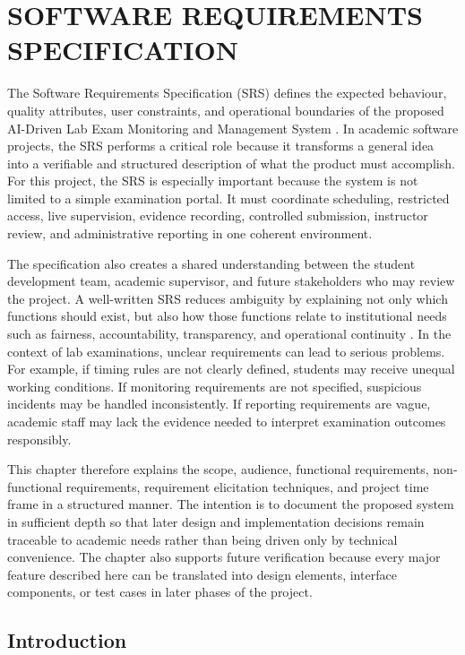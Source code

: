 \chapter{SOFTWARE REQUIREMENTS SPECIFICATION}
\label{chap:srs}

The Software Requirements Specification (SRS) defines the expected behaviour, quality attributes, user constraints, and operational boundaries of the proposed AI-Driven Lab Exam Monitoring and Management System \cite{srs1}. In academic software projects, the SRS performs a critical role because it transforms a general idea into a verifiable and structured description of what the product must accomplish. For this project, the SRS is especially important because the system is not limited to a simple examination portal. It must coordinate scheduling, restricted access, live supervision, evidence recording, controlled submission, instructor review, and administrative reporting in one coherent environment.

The specification also creates a shared understanding between the student development team, academic supervisor, and future stakeholders who may review the project. A well-written SRS reduces ambiguity by explaining not only which functions should exist, but also how those functions relate to institutional needs such as fairness, accountability, transparency, and operational continuity \cite{integ1}. In the context of lab examinations, unclear requirements can lead to serious problems. For example, if timing rules are not clearly defined, students may receive unequal working conditions. If monitoring requirements are not specified, suspicious incidents may be handled inconsistently. If reporting requirements are vague, academic staff may lack the evidence needed to interpret examination outcomes responsibly.

This chapter therefore explains the scope, audience, functional requirements, non-functional requirements, requirement elicitation techniques, and project time frame in a structured manner. The intention is to document the proposed system in sufficient depth so that later design and implementation decisions remain traceable to academic needs rather than being driven only by technical convenience. The chapter also supports future verification because every major feature described here can be translated into design elements, interface components, or test cases in later phases of the project.


\section{Introduction}

